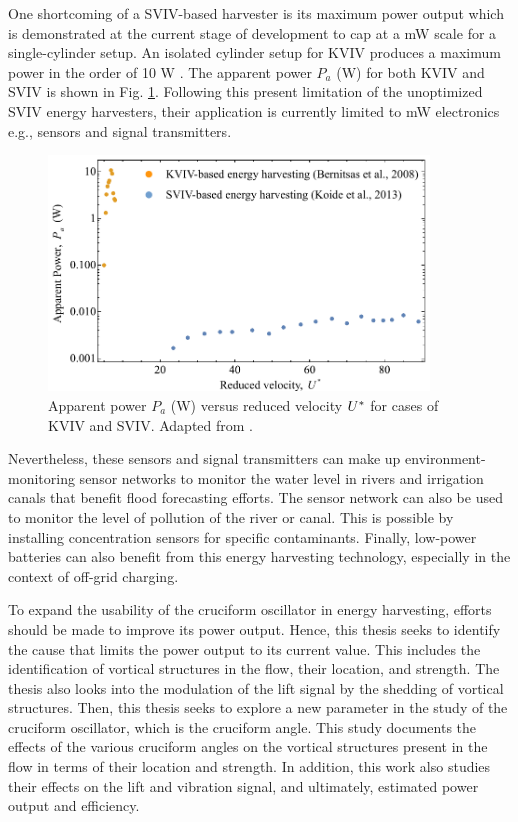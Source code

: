 \documentclass[oneside]{utmthesis}
\begin{document}
One shortcoming of a SVIV-based harvester is its maximum power output which is demonstrated at the current stage of development to cap at a mW scale for a single-cylinder setup. An isolated cylinder setup for KVIV produces a maximum power in the order of 10 W \citep{Bernitsas2009}. The apparent power $P_a$ (W) for both KVIV and SVIV is shown in Fig. \ref{fig:apparentPowerKoide}. Following this present limitation of the unoptimized SVIV energy harvesters, their application is currently limited to mW electronics e.g., sensors and signal transmitters.

\begin{figure}[H]
  \centering
  \includegraphics[width=0.9\textwidth]{figs/apparentPowerKoide}
  \caption{Apparent power $P_a $ (W) versus reduced velocity $U^{*}$ for cases of KVIV and SVIV. Adapted from \citet{Koide2013}.}
  \label{fig:apparentPowerKoide}
\end{figure}

Nevertheless, these sensors and signal transmitters can make up environment-monitoring sensor networks to monitor the water level in rivers and irrigation canals that benefit flood forecasting efforts. The sensor network can also be used to monitor the level of pollution of the river or canal. This is possible by installing concentration sensors for specific contaminants. Finally, low-power batteries can also benefit from this energy harvesting technology, especially in the context of off-grid charging.

 To expand the usability of the cruciform oscillator in energy harvesting, efforts should be made to improve its power output. Hence, this thesis seeks to identify the cause that limits the power output to its current value. This includes the identification of vortical structures in the flow, their location, and strength. The thesis also looks into the modulation of the lift signal by the shedding of vortical structures. Then, this thesis seeks to explore a new parameter in the study of the cruciform oscillator, which is the cruciform angle. This study documents the effects of the various cruciform angles on the vortical structures present in the flow in terms of their location and strength. In addition, this work also studies their effects on the lift and vibration signal, and ultimately, estimated power output and efficiency.
\end{document}
